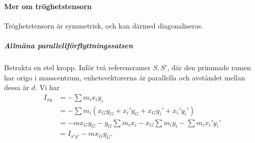 \paragraph{Mer om tröghetstensorn}
Tröghetstensorn är symmetrisk, och kan därmed diagonaliseras.

\subparagraph{Allmäna parallellförflyttningssatsen}
Betrakta en stel kropp. Inför två referensramer $S, S'$, där den primmade ramen har origo i masscentrum, enhetsvektorerna är parallella och avståndet mellan dessa är $d$. Vi har
\begin{align*}
	I _{xy} &= -\sum m_{i}x_{i}y_{i} \\
	        &= -\sum m_{i}(x_{G}y_{G} + x_{i}'y_{G} + x_{G}y_{i}' + x_{i}'y_{i}') \\
	        &= -mx_{G}y_{G} - y_{G}\sum m_{i}x_{i} - x_{G}\sum m_{i}y_{i} - \sum m_{i}x_{i}'y_{i}' \\
	        &= I_{x'y'} - mx_{G}y_{G}.
\end{align*}